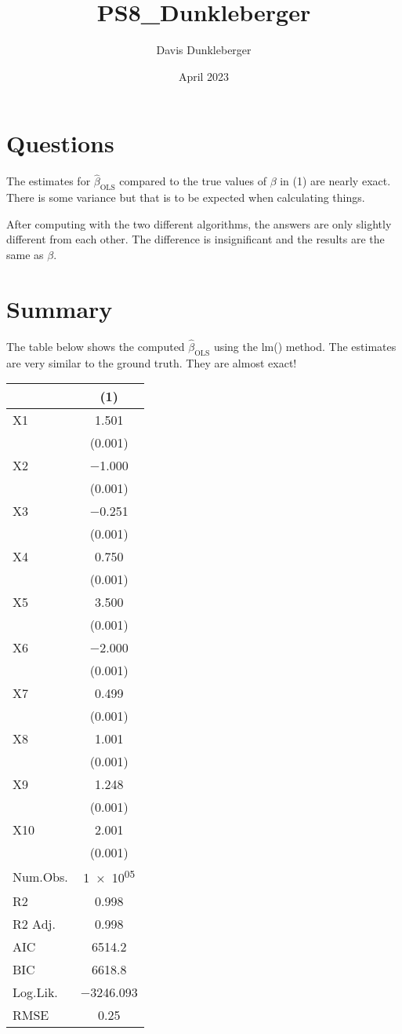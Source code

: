 \documentclass{article}
\title{PS8\_Dunkleberger}
\author{Davis Dunkleberger}
\date{April 2023}
\begin{document}
\maketitle

\section{Questions}
The estimates for $\hat{\beta}_{\text{OLS}}$ compared to the true values of $\beta$ in (1) are nearly exact. There is some variance but that is to be expected when calculating things. 

After computing with the two different algorithms, the answers are only slightly different from each other. The difference is insignificant and the results are the same as $\beta$. 

\section{Summary}
The table below shows the computed $\hat{\beta}_{\text{OLS}}$ using the lm() method. The estimates are very similar to the ground truth. They are almost exact!
\begin{table}
\centering
\begin{tabular}[t]{lc}
\toprule
  & (1)\\
\midrule
X1 & \num{1.501}\\
 & \vphantom{9} (\num{0.001})\\
X2 & \num{-1.000}\\
 & \vphantom{8} (\num{0.001})\\
X3 & \num{-0.251}\\
 & \vphantom{7} (\num{0.001})\\
X4 & \num{0.750}\\
 & \vphantom{6} (\num{0.001})\\
X5 & \num{3.500}\\
 & \vphantom{5} (\num{0.001})\\
X6 & \num{-2.000}\\
 & \vphantom{4} (\num{0.001})\\
X7 & \num{0.499}\\
 & \vphantom{3} (\num{0.001})\\
X8 & \num{1.001}\\
 & \vphantom{2} (\num{0.001})\\
X9 & \num{1.248}\\
 & \vphantom{1} (\num{0.001})\\
X10 & \num{2.001}\\
 & (\num{0.001})\\
\midrule
Num.Obs. & \num{1e+05}\\
R2 & \num{0.998}\\
R2 Adj. & \num{0.998}\\
AIC & \num{6514.2}\\
BIC & \num{6618.8}\\
Log.Lik. & \num{-3246.093}\\
RMSE & \num{0.25}\\
\bottomrule
\end{tabular}
\end{table}
\end{document}

